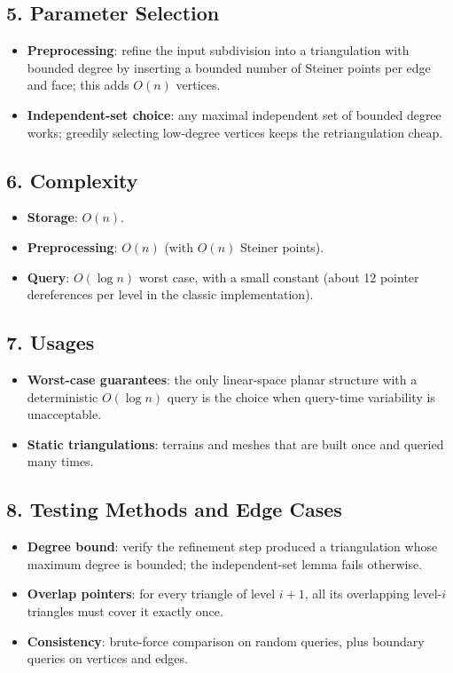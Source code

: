 \subsection{5. Parameter Selection}

\begin{itemize}
\item \textbf{Preprocessing}: refine the input subdivision into a
  triangulation with bounded degree by inserting a bounded number of
  Steiner points per edge and face; this adds $O(n)$ vertices.
\item \textbf{Independent-set choice}: any maximal independent set of
  bounded degree works; greedily selecting low-degree vertices keeps the
  retriangulation cheap.
\end{itemize}

\subsection{6. Complexity}

\begin{itemize}
\item \textbf{Storage}: $O(n)$.
\item \textbf{Preprocessing}: $O(n)$ (with $O(n)$ Steiner points).
\item \textbf{Query}: $O(\log n)$ worst case, with a small constant (about
  12 pointer dereferences per level in the classic implementation).
\end{itemize}

\subsection{7. Usages}

\begin{itemize}
\item \textbf{Worst-case guarantees}: the only linear-space planar
  structure with a deterministic $O(\log n)$ query is the choice when
  query-time variability is unacceptable.
\item \textbf{Static triangulations}: terrains and meshes that are built
  once and queried many times.
\end{itemize}

\subsection{8. Testing Methods and Edge Cases}

\begin{itemize}
\item \textbf{Degree bound}: verify the refinement step produced a
  triangulation whose maximum degree is bounded; the independent-set lemma
  fails otherwise.
\item \textbf{Overlap pointers}: for every triangle of level $i+1$, all its
  overlapping level-$i$ triangles must cover it exactly once.
\item \textbf{Consistency}: brute-force comparison on random queries, plus
  boundary queries on vertices and edges.
\end{itemize}

